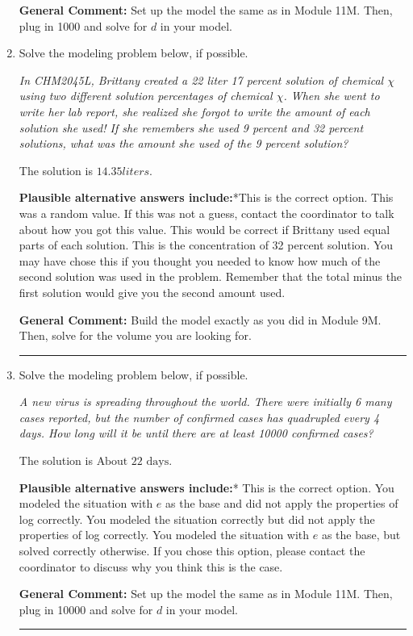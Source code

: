 \documentclass{extbook}[14pt]
\newcommand{\litem}[1]{\item #1

\rule{\textwidth}{0.4pt}}
\begin{document}
\begin{enumerate}
{\textbf{General Comment:} Set up the model the same as in Module 11M. Then, plug in 1000 and solve for $d$ in your model.
}
\litem{
Solve the modeling problem below, if possible.

\begin{center}
    \textit{ In CHM2045L, Brittany created a 22 liter 17 percent solution of chemical $\chi$ using two different solution percentages of chemical $\chi$. When she went to write her lab report, she realized she forgot to write the amount of each solution she used! If she remembers she used 9 percent and 32 percent solutions, what was the amount she used of the 9 percent solution? }
\end{center}
The solution is \( 14.35 liters \).\begin{enumerate}[label=\Alph*.]
\textbf{Plausible alternative answers include:}*This is the correct option.
This was a random value. If this was not a guess, contact the coordinator to talk about how you got this value.
This would be correct if Brittany used equal parts of each solution.
This is the concentration of 32 percent solution.
You may have chose this if you thought you needed to know how much of the second solution was used in the problem. Remember that the total minus the first solution would give you the second amount used.
\end{enumerate}

\textbf{General Comment:} Build the model exactly as you did in Module 9M. Then, solve for the volume you are looking for.
}
\litem{
Solve the modeling problem below, if possible.

\begin{center}
    \textit{ A new virus is spreading throughout the world. There were initially 6 many cases reported, but the number of confirmed cases has quadrupled every 4 days. How long will it be until there are at least 10000 confirmed cases? }
\end{center}
The solution is \( \text{About } 22 \text{ days} \).\begin{enumerate}[label=\Alph*.]
\textbf{Plausible alternative answers include:}* This is the correct option.
You modeled the situation with $e$ as the base and did not apply the properties of log correctly.
You modeled the situation correctly but did not apply the properties of log correctly.
You modeled the situation with $e$ as the base, but solved correctly otherwise.
If you chose this option, please contact the coordinator to discuss why you think this is the case.
\end{enumerate}

\textbf{General Comment:} Set up the model the same as in Module 11M. Then, plug in 10000 and solve for $d$ in your model.
}
\end{enumerate}
\end{document}
